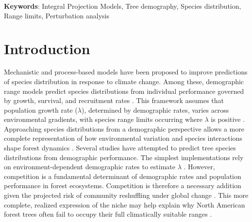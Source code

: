 \textbf{Keywords}: Integral Projection Models, Tree demography, Species
distribution, Range limits, Perturbation analysis

\hypertarget{introduction}{%
\section{Introduction}\label{introduction}}

Mechanistic and process-based models \citep{Evans2016} have been
proposed to improve predictions of species distribution in response to
climate change. Among these, demographic range models predict species
distributions from individual performance governed by growth, survival,
and recruitment rates \citep{Pagel2012}. This framework assumes that
population growth rate (\(\lambda\)), determined by demographic rates,
varies across environmental gradients, with species range limits
occurring where \(\lambda\) is positive
\citep{maguire1973niche, Holt2009, pang2024niche}. Approaching species
distributions from a demographic perspective allows a more complete
representation of how environmental variation and species interactions
shape forest dynamics \citep{Schurr2012, Svenning2014}. Several studies
have attempted to predict tree species distributions from demographic
performance. The simplest implementations rely on environment-dependent
demographic rates to estimate \(\lambda\)
\citep[e.g.~][]{Merow2014, Csergo2017}. However, competition is a
fundamental determinant of demographic rates
\citep{Luo2011, Clark2011, Zhang2015} and population performance
\citep{Scherrer2020, LeSquin2021} in forest ecosystems. Competition is
therefore a necessary addition given the projected risk of community
reshuffling under global change \citep{Alexander2016}. This more
complete, realized expression of the niche \citep{Hutchinson1957} may
help explain why North American forest trees often fail to occupy their
full climatically suitable ranges
\citep{BoucherLalonde2012, Talluto2017}.\\

